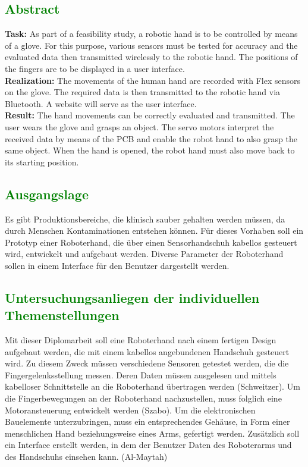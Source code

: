 \documentclass[11pt]{article}
\begin{document}
\subsection{\textcolor{green}{Abstract}}
\textbf{Task:} 
As part of a feasibility study, a robotic hand is to be controlled by means of a glove. For
this purpose, various sensors must be tested for accuracy and the evaluated data then
transmitted wirelessly to the robotic hand. The positions of the fingers are to be displayed in a
user interface. \\
\textbf{Realization:} 
The movements of the human hand are recorded with Flex sensors on the glove.
The required data is then transmitted to the robotic hand via Bluetooth. A website will serve as
the user interface. \\
\textbf{Result:} 
The hand movements can be correctly evaluated and transmitted. The user wears the
glove and grasps an object. The servo motors interpret the received data by means of the PCB
and enable the robot hand to also grasp the same object. When the hand is opened, the robot
hand must also move back to its starting position.

\subsection{\textcolor{green}{Ausgangslage}}
Es gibt Produktionsbereiche, die klinisch sauber gehalten werden müssen, da durch Menschen Kontaminationen entstehen
können. Für dieses Vorhaben soll ein Prototyp einer Roboterhand, die über einen Sensorhandschuh kabellos gesteuert wird,
entwickelt und aufgebaut werden. Diverse Parameter der Roboterhand sollen in einem Interface für den Benutzer 
dargestellt werden.

\subsection{\textcolor{green}{Untersuchungsanliegen der individuellen Themenstellungen}}
Mit dieser Diplomarbeit soll eine Roboterhand nach einem fertigen Design aufgebaut werden,
die mit einem kabellos angebundenen Handschuh gesteuert wird. Zu diesem Zweck müssen
verschiedene Sensoren getestet werden, die die Fingergelenksstellung messen. Deren Daten
müssen ausgelesen und mittels kabelloser Schnittstelle an die Roboterhand übertragen werden
(Schweitzer). Um die Fingerbewegungen an der Roboterhand nachzustellen, muss folglich eine
Motoransteuerung entwickelt werden (Szabo). Um die elektronischen Bauelemente
unterzubringen, muss ein entsprechendes Gehäuse, in Form einer menschlichen Hand
beziehungsweise eines Arms, gefertigt werden. Zusätzlich soll ein Interface erstellt werden, in
dem der Benutzer Daten des Roboterarms und des Handschuhs einsehen kann. (Al-Maytah)
\end{document}
